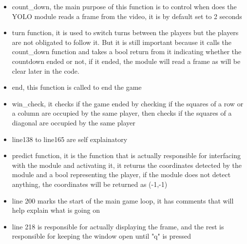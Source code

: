\documentclass{article}
\begin{document}
\begin{itemize}
\item count_down, the main purpose of this function is to control when does the YOLO module reads a frame from the video, it is by default set to 2 seconds

\item turn function, it is used to switch turns between the players but the players are not obligated to follow it. But it is still important because it calls the count_down function and takes a bool return from it indicating whether the countdown ended or not, if it ended, the module will read a frame as will be clear later in the code.

\item end, this function is called to end the game

\item win_check, it checks if the game ended by checking if the squares of a row or a column are occupied by the same player, then checks if the squares of a diagonal are occupied by the same player

\item line138 to line165 are self explainatory

\item predict function, it is the function that is actually responsible for interfacing with the module and activating it, it returns the coordinates detected by the module and a bool representing the player, if the module does not detect anything, the coordinates will be returned as (-1,-1)

\item line 200 marks the start of the main game loop, it has comments that will help explain what is going on

\item line 218 is responsible for actually displaying the frame, and the rest is responsible for keeping the window open until "q" is pressed

\end{itemize}
\end{document}
